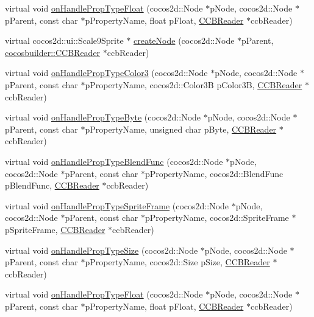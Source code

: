 \begin{DoxyCompactItemize}
virtual void \hyperlink{classcocosbuilder_1_1Scale9SpriteLoader_ae88766c6903f55ba9c246856cb4137f9}{on\+Handle\+Prop\+Type\+Float} (cocos2d\+::\+Node $\ast$p\+Node, cocos2d\+::\+Node $\ast$p\+Parent, const char $\ast$p\+Property\+Name, float p\+Float, \hyperlink{classcocosbuilder_1_1CCBReader}{C\+C\+B\+Reader} $\ast$ccb\+Reader)
\item 
virtual cocos2d\+::ui\+::\+Scale9\+Sprite $\ast$ \hyperlink{classcocosbuilder_1_1Scale9SpriteLoader_ab178ea773fe37bfe5b31f765d577e01e}{create\+Node} (cocos2d\+::\+Node $\ast$p\+Parent, \hyperlink{classcocosbuilder_1_1CCBReader}{cocosbuilder\+::\+C\+C\+B\+Reader} $\ast$ccb\+Reader)
\item 
virtual void \hyperlink{classcocosbuilder_1_1Scale9SpriteLoader_a8aa4a2a5de0d51f4a411f08d94a28089}{on\+Handle\+Prop\+Type\+Color3} (cocos2d\+::\+Node $\ast$p\+Node, cocos2d\+::\+Node $\ast$p\+Parent, const char $\ast$p\+Property\+Name, cocos2d\+::\+Color3B p\+Color3B, \hyperlink{classcocosbuilder_1_1CCBReader}{C\+C\+B\+Reader} $\ast$ccb\+Reader)
\item 
virtual void \hyperlink{classcocosbuilder_1_1Scale9SpriteLoader_ac2f65e69901bcdacacd4c893716ccc8a}{on\+Handle\+Prop\+Type\+Byte} (cocos2d\+::\+Node $\ast$p\+Node, cocos2d\+::\+Node $\ast$p\+Parent, const char $\ast$p\+Property\+Name, unsigned char p\+Byte, \hyperlink{classcocosbuilder_1_1CCBReader}{C\+C\+B\+Reader} $\ast$ccb\+Reader)
\item 
virtual void \hyperlink{classcocosbuilder_1_1Scale9SpriteLoader_ae54855ef720914b44a394f1586ed3ca0}{on\+Handle\+Prop\+Type\+Blend\+Func} (cocos2d\+::\+Node $\ast$p\+Node, cocos2d\+::\+Node $\ast$p\+Parent, const char $\ast$p\+Property\+Name, cocos2d\+::\+Blend\+Func p\+Blend\+Func, \hyperlink{classcocosbuilder_1_1CCBReader}{C\+C\+B\+Reader} $\ast$ccb\+Reader)
\item 
virtual void \hyperlink{classcocosbuilder_1_1Scale9SpriteLoader_ae076e1a1019be770dbeafbb2e268b188}{on\+Handle\+Prop\+Type\+Sprite\+Frame} (cocos2d\+::\+Node $\ast$p\+Node, cocos2d\+::\+Node $\ast$p\+Parent, const char $\ast$p\+Property\+Name, cocos2d\+::\+Sprite\+Frame $\ast$p\+Sprite\+Frame, \hyperlink{classcocosbuilder_1_1CCBReader}{C\+C\+B\+Reader} $\ast$ccb\+Reader)
\item 
virtual void \hyperlink{classcocosbuilder_1_1Scale9SpriteLoader_a749f9f634d680b8005a3ca9c86873bc9}{on\+Handle\+Prop\+Type\+Size} (cocos2d\+::\+Node $\ast$p\+Node, cocos2d\+::\+Node $\ast$p\+Parent, const char $\ast$p\+Property\+Name, cocos2d\+::\+Size p\+Size, \hyperlink{classcocosbuilder_1_1CCBReader}{C\+C\+B\+Reader} $\ast$ccb\+Reader)
\item 
virtual void \hyperlink{classcocosbuilder_1_1Scale9SpriteLoader_a9c471b3489ae20fbf0c1131b751c517d}{on\+Handle\+Prop\+Type\+Float} (cocos2d\+::\+Node $\ast$p\+Node, cocos2d\+::\+Node $\ast$p\+Parent, const char $\ast$p\+Property\+Name, float p\+Float, \hyperlink{classcocosbuilder_1_1CCBReader}{C\+C\+B\+Reader} $\ast$ccb\+Reader)
\end{DoxyCompactItemize}
